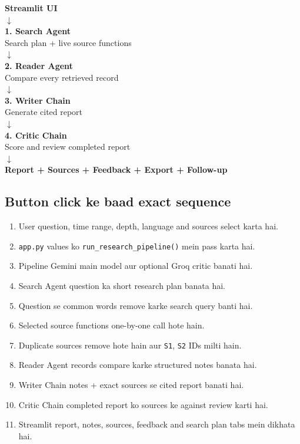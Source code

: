 \documentclass[11pt,a4paper]{article}
\newcommand{\code}[1]{\texttt{#1}}
\begin{document}
\begin{center}
\begin{tcolorbox}[width=.72\textwidth,colback=white,colframe=Brand,arc=2mm]
\centering
\textbf{Streamlit UI}\\
$\downarrow$\\
\textbf{1. Search Agent}\\
Search plan + live source functions\\
$\downarrow$\\
\textbf{2. Reader Agent}\\
Compare every retrieved record\\
$\downarrow$\\
\textbf{3. Writer Chain}\\
Generate cited report\\
$\downarrow$\\
\textbf{4. Critic Chain}\\
Score and review completed report\\
$\downarrow$\\
\textbf{Report + Sources + Feedback + Export + Follow-up}
\end{tcolorbox}
\end{center}

\subsection{Button click ke baad exact sequence}

\begin{enumerate}
  \item User question, time range, depth, language and sources select karta hai.
  \item \code{app.py} values ko \code{run\_research\_pipeline()} mein pass karta hai.
  \item Pipeline Gemini main model aur optional Groq critic banati hai.
  \item Search Agent question ka short research plan banata hai.
  \item Question se common words remove karke search query banti hai.
  \item Selected source functions one-by-one call hote hain.
  \item Duplicate sources remove hote hain aur \code{S1}, \code{S2} IDs milti hain.
  \item Reader Agent records compare karke structured notes banata hai.
  \item Writer Chain notes + exact sources se cited report banati hai.
  \item Critic Chain completed report ko sources ke against review karti hai.
  \item Streamlit report, notes, sources, feedback and search plan tabs mein dikhata hai.
\end{enumerate}
\end{document}
